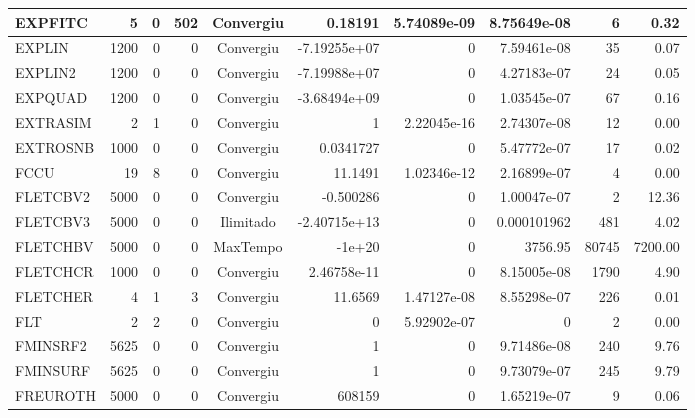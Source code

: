 \begin{center}
\begin{longtable}{|l|r|r|r|c|r|r|r|r|r|}
 EXPFITC &      5 &      0 &    502 & Convergiu  &     0.18191 &    5.74089e-09 & 8.75649e-08 &      6 &    0.32 \\ \hline
  EXPLIN &   1200 &      0 &      0 & Convergiu  & -7.19255e+07 &              0 & 7.59461e-08 &     35 &    0.07 \\ \hline
 EXPLIN2 &   1200 &      0 &      0 & Convergiu  & -7.19988e+07 &              0 & 4.27183e-07 &     24 &    0.05 \\ \hline
 EXPQUAD &   1200 &      0 &      0 & Convergiu  & -3.68494e+09 &              0 & 1.03545e-07 &     67 &    0.16 \\ \hline
EXTRASIM &      2 &      1 &      0 & Convergiu  &           1 &    2.22045e-16 & 2.74307e-08 &     12 &    0.00 \\ \hline
EXTROSNB &   1000 &      0 &      0 & Convergiu  &   0.0341727 &              0 & 5.47772e-07 &     17 &    0.02 \\ \hline
    FCCU &     19 &      8 &      0 & Convergiu  &     11.1491 &    1.02346e-12 & 2.16899e-07 &      4 &    0.00 \\ \hline
FLETCBV2 &   5000 &      0 &      0 & Convergiu  &   -0.500286 &              0 & 1.00047e-07 &      2 &   12.36 \\ \hline
FLETCBV3 &   5000 &      0 &      0 & Ilimitado  & -2.40715e+13 &              0 & 0.000101962 &    481 &    4.02 \\ \hline
FLETCHBV &   5000 &      0 &      0 & MaxTempo   &      -1e+20 &              0 &     3756.95 &  80745 & 7200.00 \\ \hline
FLETCHCR &   1000 &      0 &      0 & Convergiu  & 2.46758e-11 &              0 & 8.15005e-08 &   1790 &    4.90 \\ \hline
FLETCHER &      4 &      1 &      3 & Convergiu  &     11.6569 &    1.47127e-08 & 8.55298e-07 &    226 &    0.01 \\ \hline
     FLT &      2 &      2 &      0 & Convergiu  &           0 &    5.92902e-07 &           0 &      2 &    0.00 \\ \hline
FMINSRF2 &   5625 &      0 &      0 & Convergiu  &           1 &              0 & 9.71486e-08 &    240 &    9.76 \\ \hline
FMINSURF &   5625 &      0 &      0 & Convergiu  &           1 &              0 & 9.73079e-07 &    245 &    9.79 \\ \hline
FREUROTH &   5000 &      0 &      0 & Convergiu  &      608159 &              0 & 1.65219e-07 &      9 &    0.06 \\ \hline

\end{longtable}
\end{center}

